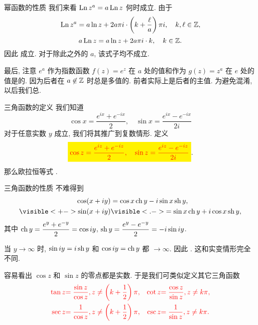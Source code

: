 \begin{frame}{幂函数的性质}
\onslide<+->
我们来看 $\operatorname{Ln} z^a=a\operatorname{Ln} z$ 何时成立.
\onslide<+->
由于
\[\operatorname{Ln} z^a=a\ln z+2a\pi i\cdot\left(k+\frac\ell a\right)\pi i,\quad k,\ell\in{\mathbb{Z}},\]
\vspace{-\baselineskip}
\onslide<+->
\[a\operatorname{Ln} z=a\ln z+2a\pi i\cdot k,\quad k\in{\mathbb{Z}}.\]
\onslide<+->
因此 成立.
\onslide<+->
对于除此之外的 $a$, 该式子均不成立.

\onslide<+->
最后, 注意 $e^a$ 作为指数函数 $f(z)=e^z$ 在 $a$ 处的值和作为 $g(z)=z^a$ 在 $e$ 处的值是的.
\onslide<+->
因为后者在 $a\not\in{\mathbb{Z}}$ 时总是多值的.
\onslide<+->
前者实际上是后者的主值.
\onslide<+->
为避免混淆, 以后我们总.
\end{frame}


\begin{frame}{三角函数的定义}
\onslide<+->
我们知道
\[\cos x=\frac{e^{ix}+e^{-ix}}2,\quad
\sin x=\frac{e^{ix}-e^{-ix}}{2i}\]
对于任意实数 $y$ 成立,
\onslide<+->
我们将其推广到复数情形.
\onslide<+->
定义
\[\boxatt{$\displaystyle\cos z=\frac{e^{iz}+e^{-iz}}2,\quad
\sin z=\frac{e^{iz}-e^{-iz}}{2i}$}.\]
\onslide<+->
那么欧拉恒等式 .
\end{frame}


\begin{frame}{三角函数的性质}
\onslide<+->
不难得到
\begin{align*}
\cos(x+iy)&
=\cos x \ch y-i\sin x\sh y,\\
\visible<+->{\sin(x+iy)}&
\visible<.->{=\sin x\ch y+i\cos x\sh y,}
\end{align*}
\onslide<+->
其中 $\operatorname{ch} y=\dfrac{e^y+e^{-y}}2=\cos{iy}$, $\operatorname{sh} y=\dfrac{e^y-e^{-y}}2=-i\sin{iy}$.

\onslide<+->
当 $y\to\infty$ 时, $\sin iy=i\operatorname{sh} y$ 和 $\cos iy=\operatorname{ch} y$ 都 $\to\infty$.
\onslide<+->
因此 . 
\onslide<+->
这和实变情形完全不同.

\onslide<+->
容易看出 $\cos z$ 和 $\sin z$ 的零点都是实数.
\onslide<+->
于是我们可类似定义其它三角函数
\begin{align*}
{\color{red}{\tan z}}&
{\color{red}{=\frac{\sin z}{\cos z},z\neq\left(k+\frac{1}{2}\right)\pi,}}&
{\color{red}{\cot z}}&
{\color{red}{=\frac{\cos z}{\sin z},z\neq k\pi,}}\\
{\color{red}{\sec z}}&
{\color{red}{=\frac{1}{\cos z},z\neq\left(k+\frac{1}{2}\right)\pi,}}&
{\color{red}{\csc z}}&
{\color{red}{=\frac{1}{\sin z},z\neq k\pi.}}
\end{align*}
\end{frame}


